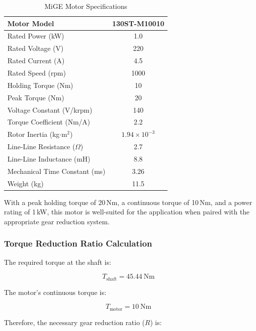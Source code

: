 \begin{table}[H]
    \centering
    \begin{tabular}{|l|c|}
        \hline
        \textbf{Motor Model} & 130ST-M10010 \\
        \hline
        Rated Power (kW) & 1.0 \\
        \hline
        Rated Voltage (V) & 220 \\
        \hline
        Rated Current (A) & 4.5 \\
        \hline
        Rated Speed (rpm) & 1000 \\
        \hline
        Holding Torque (Nm) & 10 \\
        \hline
        Peak Torque (Nm) & 20 \\
        \hline
        Voltage Constant (V/krpm) & 140 \\
        \hline
        Torque Coefficient (Nm/A) & 2.2 \\
        \hline
        Rotor Inertia (kg$\cdot$m$^2$) & $1.94 \times 10^{-3}$ \\
        \hline
        Line-Line Resistance ($\Omega$) & 2.7 \\
        \hline
        Line-Line Inductance (mH) & 8.8 \\
        \hline
        Mechanical Time Constant (ms) & 3.26 \\
        \hline
        Weight (kg) & 11.5 \\
        \hline
    \end{tabular}
    \caption{MiGE Motor Specifications}
    \label{tab:motor_specs}
\end{table}

With a peak holding torque of 20\,Nm, a continuous torque of 10\,Nm, and a power rating of 1\,kW, this motor is well-suited for the application when paired with the appropriate gear reduction system.

\subsubsection*{Torque Reduction Ratio Calculation}

The required torque at the shaft is:

\[
T_{\text{shaft}} = 45.44\ \text{Nm}
\]

The motor's continuous torque is:

\[
T_{\text{motor}} = 10\ \text{Nm}
\]

Therefore, the necessary gear reduction ratio (\( R \)) is:

